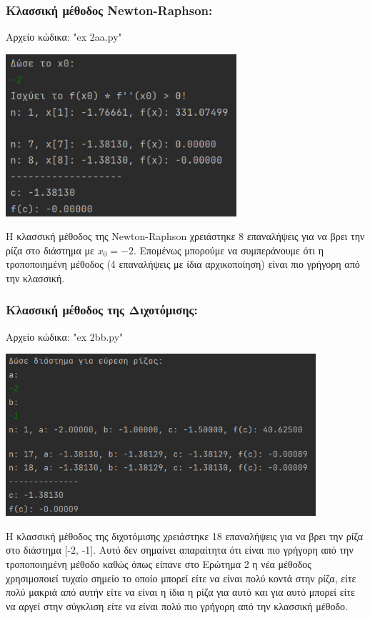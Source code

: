 \documentclass{article}
\begin{document}
    \subsubsection{Κλασσική μέθοδος Newton-Raphson:}
    Αρχείο κώδικα: "ex 2aa.py"
    \begin{center}\includegraphics[height = 6cm]{images/results_22.png}\end{center}
    Η κλασσική μέθοδος της Newton-Raphson χρειάστηκε 8 επαναλήψεις για να βρει την ρίζα στο διάστημα με \(x_{0} = -2\). Επομένως μπορούμε να συμπεράνουμε ότι η τροποποιημένη μέθοδος (4 επαναλήψεις με ίδια αρχικοποίηση) είναι πιο γρήγορη από την κλασσική.
        
    \subsubsection{Κλασσική μέθοδος της Διχοτόμισης:}
    Αρχείο κώδικα: "ex 2bb.py"
    \begin{center}\includegraphics[height = 6cm]{images/results_23.png}\end{center}
    Η κλασσική μέθοδος της διχοτόμισης χρειάστηκε 18 επαναλήψεις για να βρει την ρίζα στο διάστημα [-2, -1]. Αυτό δεν σημαίνει απαραίτητα ότι είναι πιο γρήγορη από την τροποποιημένη μέθοδο καθώς όπως είπανε στο Ερώτημα 2 η νέα μέθοδος χρησιμοποιεί τυχαίο σημείο το οποίο μπορεί είτε να είναι πολύ κοντά στην ρίζα, είτε πολύ μακριά από αυτήν είτε να είναι η ίδια η ρίζα για αυτό και για αυτό μπορεί είτε να αργεί στην σύγκλιση είτε να είναι πολύ πιο γρήγορη από την κλασσική μέθοδο.
\end{document}
